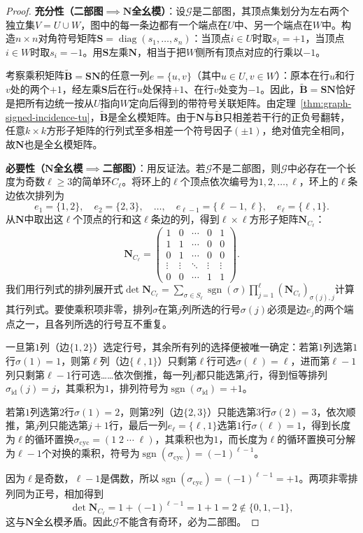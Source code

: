 \begin{proof}
\textbf{充分性（二部图$\implies\bm{N}$全幺模）}：设$\mathcal{G}$是二部图，其顶点集划分为左右两个独立集$V=U\cup W$，图中的每一条边都有一个端点在$U$中、另一个端点在$W$中。构造$n\times n$对角符号矩阵$\bm{S}=\operatorname{diag}(s_1,\ldots,s_n)$：当顶点$i\in U$时取$s_i=+1$，当顶点$i\in W$时取$s_i=-1$。用$\bm{S}$左乘$\bm{N}$，相当于把$W$侧所有顶点对应的行乘以$-1$。

考察乘积矩阵$\widetilde{\bm{B}}=\bm{S}\bm{N}$的任意一列$e=\{u,v\}$（其中$u\in U,v\in W$）：原本在行$u$和行$v$处的两个$+1$，经左乘$\bm{S}$后在行$u$处保持$+1$、在行$v$处变为$-1$。因此，$\widetilde{\bm{B}}=\bm{S}\bm{N}$恰好是把所有边统一按从$U$指向$W$定向后得到的带符号关联矩阵。由定理~\ref{thm:graph-signed-incidence-tu}，$\widetilde{\bm{B}}$是全幺模矩阵。由于$\bm{N}$与$\widetilde{\bm{B}}$只相差若干行的正负号翻转，任意$k\times k$方形子矩阵的行列式至多相差一个符号因子$(\pm1)$，绝对值完全相同，故$\bm{N}$也是全幺模矩阵。

\textbf{必要性（$\bm{N}$全幺模$\implies$二部图）}：用反证法。若$\mathcal{G}$不是二部图，则$\mathcal{G}$中必存在一个长度为奇数$\ell\geq 3$的简单环$C_\ell$。将环上的$\ell$个顶点依次编号为$1,2,\ldots,\ell$，环上的$\ell$条边依次排列为
\[
e_1=\{1,2\},\quad e_2=\{2,3\},\quad \ldots,\quad e_{\ell-1}=\{\ell-1,\ell\},\quad e_\ell=\{\ell,1\}.
\]
从$\bm{N}$中取出这$\ell$个顶点的行和这$\ell$条边的列，得到$\ell\times\ell$方形子矩阵$\bm{N}_{C_\ell}$：
\[
\bm{N}_{C_\ell}=
\begin{pmatrix}
1 & 0 & \cdots & 0 & 1\\
1 & 1 & \cdots & 0 & 0\\
0 & 1 & \cdots & 0 & 0\\
\vdots & \vdots & \ddots & \vdots & \vdots\\
0 & 0 & \cdots & 1 & 1
\end{pmatrix}.
\]
我们用行列式的排列展开式$\det\bm{N}_{C_\ell}=\sum_{\sigma\in S_\ell}\operatorname{sgn}(\sigma)\prod_{j=1}^\ell (\bm{N}_{C_\ell})_{\sigma(j),j}$计算其行列式。要使乘积项非零，排列$\sigma$在第$j$列所选的行号$\sigma(j)$必须是边$e_j$的两个端点之一，且各列所选的行号互不重复。

一旦第$1$列（边$\{1,2\}$）选定行号，其余所有列的选择便被唯一确定：若第$1$列选第$1$行$\sigma(1)=1$，则第$\ell$列（边$\{\ell,1\}$）只剩第$\ell$行可选$\sigma(\ell)=\ell$，进而第$\ell-1$列只剩第$\ell-1$行可选……依次倒推，每一列$j$都只能选第$j$行，得到恒等排列$\sigma_{\mathrm{id}}(j)=j$，其乘积为$1$，排列符号为$\operatorname{sgn}(\sigma_{\mathrm{id}})=+1$。

若第$1$列选第$2$行$\sigma(1)=2$，则第$2$列（边$\{2,3\}$）只能选第$3$行$\sigma(2)=3$，依次顺推，第$j$列只能选第$j+1$行，最后一列$e_\ell=\{\ell,1\}$选第$1$行$\sigma(\ell)=1$，得到长度为$\ell$的循环置换$\sigma_{\mathrm{cyc}}=(1\;2\;\cdots\;\ell)$，其乘积也为$1$，而长度为$\ell$的循环置换可分解为$\ell-1$个对换的乘积，符号为$\operatorname{sgn}(\sigma_{\mathrm{cyc}})=(-1)^{\ell-1}$。

因为$\ell$是奇数，$\ell-1$是偶数，所以$\operatorname{sgn}(\sigma_{\mathrm{cyc}})=(-1)^{\ell-1}=+1$。两项非零排列同为正号，相加得到
\[
\det\bm{N}_{C_\ell}=1+(-1)^{\ell-1}=1+1=2\notin\{0,1,-1\},
\]
这与$\bm{N}$全幺模矛盾。因此$\mathcal{G}$不能含有奇环，必为二部图。
\end{proof}

